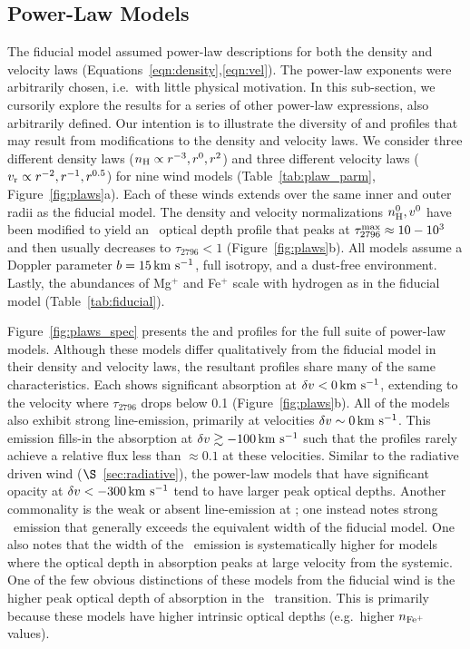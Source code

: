 \documentclass[12pt,preprint]{aastex}
\begin{document}
\subsection{Power-Law Models}
\label{sec:power}

The fiducial model assumed power-law descriptions for both the density and velocity
laws (Equations~\ref{eqn:density},\ref{eqn:vel}).
The power-law exponents were arbitrarily chosen, i.e.\ with little physical
motivation.  In this sub-section, we cursorily explore the results for a series
of other power-law expressions, also arbitrarily defined.
Our intention is to illustrate the diversity of  and
 profiles that may result from modifications to the density
and velocity laws.
We consider three different density laws ($n_{\rm H} \propto
r^{-3}, r^{0}, r^2$) and three different velocity laws ($v_{\rm r}
\propto r^{-2}, r^{-1}, r^{0.5}$) for nine wind models
(Table~\ref{tab:plaw_parm}, Figure~\ref{fig:plaws}a).  
Each of these winds extends over the same inner and outer radii as the
fiducial model.
The density and velocity normalizations $n_{\rm H}^0, v^0$ have been
modified to yield an \mgiia\ optical depth profile that peaks at
$\tau_{2796}^{\rm max} \approx 10-10^3$ and then usually decreases to
$\tau_{2796} < 1$ (Figure~\ref{fig:plaws}b). 
All models assume a Doppler parameter
$b=15\, {\rm km~s^{-1}}$, full isotropy, and a dust-free environment.
Lastly, the abundances of Mg$^+$ and Fe$^+$ scale with hydrogen as
in the fiducial model (Table~\ref{tab:fiducial}).

Figure~\ref{fig:plaws_spec} presents the  and 
profiles for the full suite of power-law models.  Although these
models differ qualitatively from the fiducial model in their density
and velocity laws, the resultant profiles share many of the same
characteristics.  Each shows significant absorption at $\delta v < 0
\, {\rm km~s^{-1}}$, extending to the velocity where $\tau_{2796}$ drops below 0.1
(Figure~\ref{fig:plaws}b).  All of the models also exhibit strong
line-emission, primarily at velocities $\delta v \sim 0 \, {\rm km~s^{-1}}$.  
This emission fills-in the  absorption at $\delta v \gtrsim
-100 \, {\rm km~s^{-1}}$ such that the profiles rarely achieve a relative flux less
than $\approx 0.1$ at these velocities. 
Similar to the radiative driven wind ($\S$~\ref{sec:radiative}),
the power-law models that have significant opacity at $\delta v <
-300 \, {\rm km~s^{-1}}$ tend to have larger peak optical depths.  Another commonality is
the weak or absent line-emission at \feiia; one instead notes strong
\feiic\ emission that generally exceeds the equivalent width of the
fiducial model.  One also notes that the width of the \feiis\ emission
is systematically higher for models where the optical depth in
absorption peaks at large velocity from the systemic.
One of the few obvious distinctions of these models from the fiducial wind is
the higher peak optical depth of absorption in the \feiib\
transition.  This is primarily because these models have 
higher intrinsic optical depths (e.g.\ higher $n_{\rm Fe^+}$ values).
\end{document}
